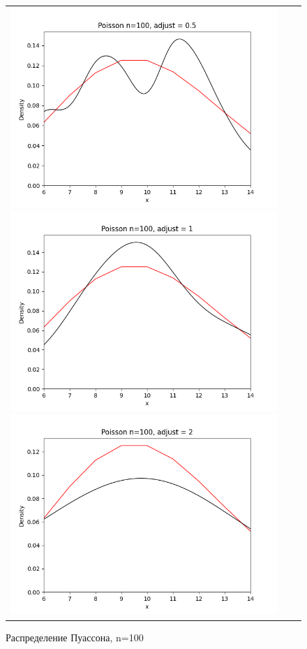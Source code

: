 \begin{figure}[H]
	\begin{tabular}{ccc}
		\includegraphics[scale=0.33]{poisson_n100_adjust0.5.png}
		\includegraphics[scale=0.33]{poisson_n100_adjust1.png}
		\includegraphics[scale=0.33]{poisson_n100_adjust2.png}
	\end{tabular}
	\caption{Распределение Пуассона, n=100}
\end{figure}



